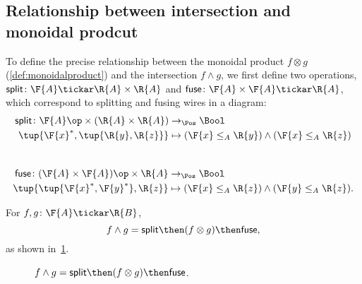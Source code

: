 \subsection{Relationship between intersection and monoidal prodcut}
To define the precise relationship between the monoidal product $f \otimes g$ (\cref{def:monoidalproduct}) and the intersection $f \wedge g$, we first define two operations, $\mathsf{split} \colon \F{A} \tickar \R{A} \times \R{A}$ and $\mathsf{fuse} \colon \F{A} \times \F{A} \tickar \R{A}$, which correspond to splitting and fusing wires in a diagram:
\begin{equation}
\begin{aligned}
    \mathsf{split} \colon \F{A}\op \times (\R{A} \times \R{A}) &\to_\Pos \Bool \\
    \tup{\F{x}^*, \tup{\R{y}, \R{z}}} &\mapsto (\F{x} \leq_A \R{y}) \wedge (\F{x} \leq_A \R{z})
\end{aligned}
\end{equation}
~
\begin{equation}
\begin{aligned}
    \mathsf{fuse} \colon (\F{A} \times \F{A})\op \times \R{A} &\to_\Pos \Bool \\
    \tup{ \tup{\F{x}^*, \F{y}^*}, \R{z}} &\mapsto (\F{x} \leq_A \R{z}) \wedge (\F{y} \leq_A \R{z}).
\end{aligned}
\end{equation}

\begin{lemma}
\label{lemma:intersection}
For $f,g \colon \F{A} \tickar \R{B}$,
\begin{equation}
f \wedge g = \mathsf{split} \then (f \otimes g) \then \mathsf{fuse},
\end{equation}
as shown in~\cref{fig:lemmasplitfuse}.
\begin{figure}[h!]
\begin{center}
\end{center}
\caption{$f \wedge g = \mathsf{split} \then (f \otimes g) \then \mathsf{fuse}$. \label{fig:lemmasplitfuse}}
\end{figure}
\end{lemma}


